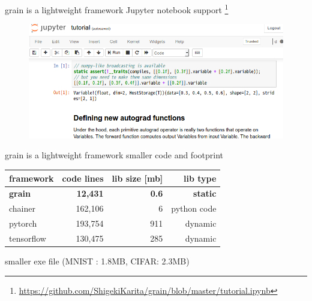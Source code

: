 \documentclass[aspectratio=169,
  14pt,xcolor=dvipsnames,table,professional font,dvipdfmx]{beamer}
\begin{document}
\begin{frame}[fragile]{grain is \alert{a lightweight framework}}
  Jupyter notebook support
  \footnote{\alert{\url{https://github.com/ShigekiKarita/grain/blob/master/tutorial.ipynb}}}
  \begin{figure}[b]
	\centering
	\includegraphics[height=0.6\textheight]{./fig/jupyterd.png}
  \end{figure}
  \scriptsize
\end{frame}

\begin{frame}[fragile]{grain is \alert{a lightweight framework}}
  smaller code and footprint
  \begin{table}
	\begin{tabular}{lrrr}
      \toprule
      framework   & code lines & lib size [mb] & lib type  \\
      \midrule
      \textbf{grain} &  \textbf{12,431} & \textbf{0.6}  & \textbf{static} \\
      chainer    & 162,106 & 6 & python code \\
      pytorch    & 193,754 & 911 &dynamic \\
      tensorflow & 130,475 & 285 & dynamic  \\
      \bottomrule
	\end{tabular}
  \end{table}
  smaller exe file (MNIST : 1.8MB, CIFAR: 2.3MB)
\end{frame}
\end{document}
